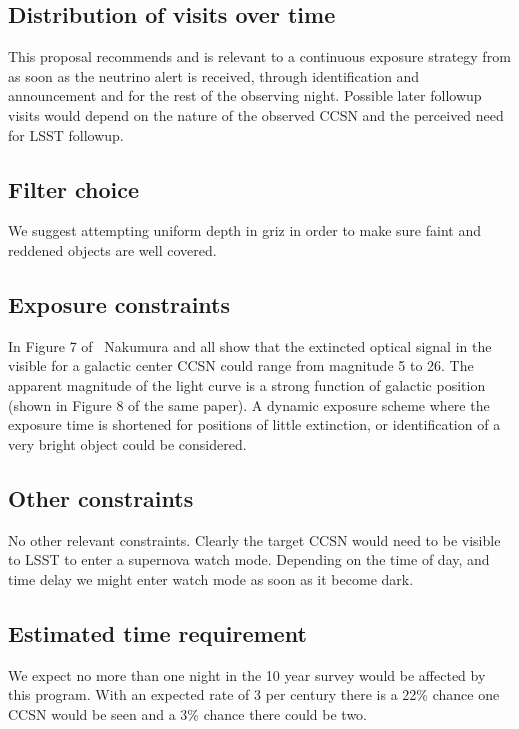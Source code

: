 \documentclass[11pt, letterpaper]{article}
\begin{document}
\subsection{Distribution of visits over time}

This proposal recommends and is relevant to a continuous exposure
strategy from as soon as the neutrino alert is received, through
identification and announcement and for the rest of the observing
night.  Possible later followup visits would depend on the nature of
the observed CCSN and the perceived need for LSST followup.

\subsection{Filter choice}

We suggest attempting uniform depth in griz in order to make sure
faint and reddened objects are well covered.

\subsection{Exposure constraints}

In Figure 7 of~\cite{2016MNRAS.461.3296N} Nakumura and all show that
the extincted optical signal in the visible for a galactic center CCSN
could range from magnitude 5 to 26. The apparent magnitude of the
light curve is a strong function of galactic position (shown in Figure
8 of the same paper).  A dynamic exposure scheme where the exposure
time is shortened for positions of little extinction, or
identification of a very bright object could be considered.

\subsection{Other constraints}

No other relevant constraints.  Clearly the target CCSN would need to be
visible to LSST to enter a supernova watch mode.  Depending on the
time of day, and time delay we might enter watch mode as soon as it
become dark.

\subsection{Estimated time requirement}

We expect no more than one night in the 10 year survey would be
affected by this program. With an expected rate of 3 per century there
is a 22\% chance one CCSN would be seen and a 3\% chance there could
be two.
\end{document}

